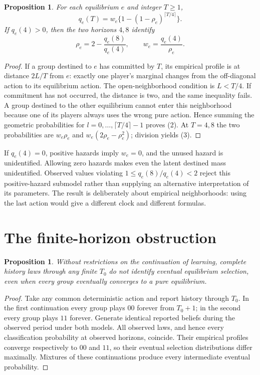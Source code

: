 \documentclass[11pt]{article}
\newtheorem{proposition}[theorem]{Proposition}
\theoremstyle{definition}
\begin{document}
\begin{proposition}
For each equilibrium $e$ and integer $T\ge1$,
\[
 q_e(T)=w_e\{1-(1-\rho_e)^{\lceil T/4\rceil}\}.              \tag{2}
\]
If $q_e(4)>0$, then the two horizons $4,8$ identify
\[
 \rho_e=2-\frac{q_e(8)}{q_e(4)},\qquad
 w_e=\frac{q_e(4)}{\rho_e}.                                \tag{3}
\]
\end{proposition}
\begin{proof}
If a group destined to $e$ has committed by $T$, its empirical profile is
at distance $2L/T$ from $e$: exactly one player's marginal changes from
the off-diagonal action to its equilibrium action. The open-neighborhood
condition is $L<T/4$. If commitment has not occurred, the distance is two,
and the same inequality fails. A group destined to the other equilibrium
cannot enter this neighborhood because one of its players always uses
the wrong pure action. Hence summing the geometric probabilities for
$l=0,\ldots,\lceil T/4\rceil-1$ proves (2). At $T=4,8$ the two
probabilities are $w_e\rho_e$ and $w_e(2\rho_e-\rho_e^2)$;
division yields (3).
\end{proof}
If $q_e(4)=0$, positive hazards imply $w_e=0$, and the unused hazard is
unidentified. Allowing zero hazards makes even the latent destined mass
unidentified. Observed values violating $1\le q_e(8)/q_e(4)<2$ reject
this positive-hazard submodel rather than supplying an alternative
interpretation of its parameters. The result is deliberately about
empirical neighborhoods: using the last action would give a different
clock and different formulas.

\section*{The finite-horizon obstruction}
\begin{proposition}
Without restrictions on the continuation of learning, complete history
laws through any finite $T_0$ do not identify eventual equilibrium
selection, even when every group eventually converges to a pure equilibrium.
\end{proposition}
\begin{proof}
Take any common deterministic action and report history through $T_0$.
In the first continuation every group plays $00$ forever from $T_0+1$;
in the second every group plays $11$ forever. Generate identical reported
beliefs during the observed period under both models. All observed laws,
and hence every classification probability at observed horizons, coincide.
Their empirical profiles converge respectively to $00$ and $11$, so their
eventual selection distributions differ maximally. Mixtures of these
continuations produce every intermediate eventual probability.
\end{proof}
\end{document}
